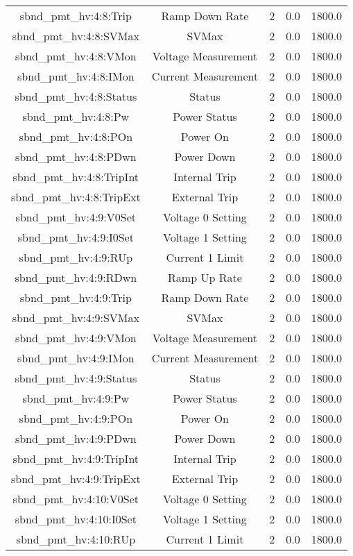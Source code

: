 \begin{table}[ptb]
\begin{tabular}{c | c c c c}
sbnd_pmt_hv:4:8:Trip & Ramp Down Rate & 2 & 0.0 & 1800.0\\ 
sbnd_pmt_hv:4:8:SVMax & SVMax & 2 & 0.0 & 1800.0\\ 
sbnd_pmt_hv:4:8:VMon & Voltage Measurement & 2 & 0.0 & 1800.0\\ 
sbnd_pmt_hv:4:8:IMon & Current Measurement & 2 & 0.0 & 1800.0\\ 
sbnd_pmt_hv:4:8:Status & Status & 2 & 0.0 & 1800.0\\ 
sbnd_pmt_hv:4:8:Pw & Power Status & 2 & 0.0 & 1800.0\\ 
sbnd_pmt_hv:4:8:POn & Power On & 2 & 0.0 & 1800.0\\ 
sbnd_pmt_hv:4:8:PDwn & Power Down & 2 & 0.0 & 1800.0\\ 
sbnd_pmt_hv:4:8:TripInt & Internal Trip & 2 & 0.0 & 1800.0\\ 
sbnd_pmt_hv:4:8:TripExt & External Trip & 2 & 0.0 & 1800.0\\ 
sbnd_pmt_hv:4:9:V0Set & Voltage 0 Setting & 2 & 0.0 & 1800.0\\ 
sbnd_pmt_hv:4:9:I0Set & Voltage 1 Setting & 2 & 0.0 & 1800.0\\ 
sbnd_pmt_hv:4:9:RUp & Current 1 Limit & 2 & 0.0 & 1800.0\\ 
sbnd_pmt_hv:4:9:RDwn & Ramp Up Rate & 2 & 0.0 & 1800.0\\ 
sbnd_pmt_hv:4:9:Trip & Ramp Down Rate & 2 & 0.0 & 1800.0\\ 
sbnd_pmt_hv:4:9:SVMax & SVMax & 2 & 0.0 & 1800.0\\ 
sbnd_pmt_hv:4:9:VMon & Voltage Measurement & 2 & 0.0 & 1800.0\\ 
sbnd_pmt_hv:4:9:IMon & Current Measurement & 2 & 0.0 & 1800.0\\ 
sbnd_pmt_hv:4:9:Status & Status & 2 & 0.0 & 1800.0\\ 
sbnd_pmt_hv:4:9:Pw & Power Status & 2 & 0.0 & 1800.0\\ 
sbnd_pmt_hv:4:9:POn & Power On & 2 & 0.0 & 1800.0\\ 
sbnd_pmt_hv:4:9:PDwn & Power Down & 2 & 0.0 & 1800.0\\ 
sbnd_pmt_hv:4:9:TripInt & Internal Trip & 2 & 0.0 & 1800.0\\ 
sbnd_pmt_hv:4:9:TripExt & External Trip & 2 & 0.0 & 1800.0\\ 
sbnd_pmt_hv:4:10:V0Set & Voltage 0 Setting & 2 & 0.0 & 1800.0\\ 
sbnd_pmt_hv:4:10:I0Set & Voltage 1 Setting & 2 & 0.0 & 1800.0\\ 
sbnd_pmt_hv:4:10:RUp & Current 1 Limit & 2 & 0.0 & 1800.0\\ 

\end{tabular}
\end{table}
